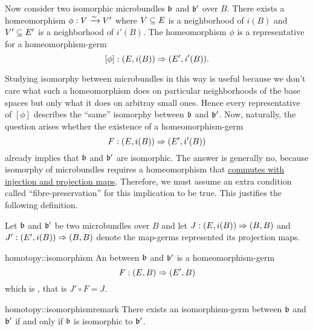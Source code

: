 \begin{myparagraph}
    Now consider two isomorphic microbundles $\mathfrak{b}$ and $\mathfrak{b}'$ over $B$.
    There exists a homeomorphism $\phi: V \xrightarrow{\sim} V'$ where $V \subseteq{} E$ is a neighborhood of $i(B)$ and $V' \subseteq{} E'$ is a neighborhood of $i'(B)$.
    The homeomorphism $\phi$ is a representative for a homeomorphism-germ
    \[ [\phi]: (E, i(B)) \Rightarrow{} (E', i'(B)). \]

    Studying isomorphy between microbundles in this way is useful because we don't care what such a
    homeomorphism does on particular neighborhoods of the base spaces but only what it does on arbitray small ones.
    Hence every representative of $[\phi]$ describes the ``same'' isomorphy between $\mathfrak{b}$ and $\mathfrak{b}'$.
    Now, naturally, the question arises whether the existence of a homeomorphism-germ
    \[ F: (E, i(B)) \Rightarrow{} (E', i'(B)) \]
    already implies that $\mathfrak{b}$ and $\mathfrak{b}'$ are isomorphic.
    The answer is generally no, because isomorphy of microbundles requires 
    a homeomorphism that \ul{commutes with injection and projection maps}.
    Therefore, we must assume an extra condition called ``fibre-preservation'' for this implication to be true.
    This justifies the following definition.
    
    Let $\mathfrak{b}$ and $\mathfrak{b}'$ be two microbundles over $B$ and
    let $J: (E, i(B)) \Rightarrow{} (B, B)$ and $J': (E', i(B)) \Rightarrow{} (B, B)$ denote the map-germs represented its projection maps.
\end{myparagraph}

\begin{mydefinition}{homotopy::isomorphism}
    An  between $\mathfrak{b}$ and $\mathfrak{b}'$ is a homeomorphism-germ 
    \[ F: (E, B) \Rightarrow{} (E', B) \]
    which is , that is $J' \circ F = J$.
\end{mydefinition}

\begin{myremark}{homotopy::isomorphismremark}
    There exists an isomorphism-germ between $\mathfrak{b}$ and $\mathfrak{b}'$ if and only if $\mathfrak{b}$ is isomorphic to $\mathfrak{b}'$.
\end{myremark}